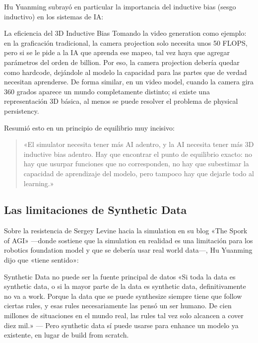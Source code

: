Hu Yuanming subrayó en particular la importancia del inductive bias (sesgo inductivo) en los sistemas de IA:

\begin{importantbox}{La eficiencia del 3D Inductive Bias}
Tomando la video generation como ejemplo: en la graficación tradicional, la camera projection solo necesita unos 50 FLOPS, pero si se le pide a la IA que aprenda ese mapeo, tal vez haya que agregar parámetros del orden de billion. Por eso, la camera projection debería quedar como hardcode, dejándole al modelo la capacidad para las partes que de verdad necesitan aprenderse. De forma similar, en un video model, cuando la camera gira 360 grados aparece un mundo completamente distinto; si existe una representación 3D básica, al menos se puede resolver el problema de physical persistency.
\end{importantbox}

Resumió esto en un principio de equilibrio muy incisivo:

\begin{quote}
«El simulator necesita tener más AI adentro, y la AI necesita tener más 3D inductive bias adentro. Hay que encontrar el punto de equilibrio exacto: no hay que usurpar funciones que no corresponden, no hay que subestimar la capacidad de aprendizaje del modelo, pero tampoco hay que dejarle todo al learning.»
\end{quote}

\subsection{Las limitaciones de Synthetic Data}

Sobre la resistencia de Sergey Levine hacia la simulation en su blog «The Spork of AGI» —donde sostiene que la simulation en realidad es una limitación para los robotics foundation model y que se debería usar real world data—, Hu Yuanming dijo que «tiene sentido»:

\begin{warningbox}{Synthetic Data no puede ser la fuente principal de datos}
«Si toda la data es synthetic data, o si la mayor parte de la data es synthetic data, definitivamente no va a work. Porque la data que se puede synthesize siempre tiene que follow ciertas rules, y esas rules necesariamente las pensó un ser humano. De cien millones de situaciones en el mundo real, las rules tal vez solo alcancen a cover diez mil.» — Pero synthetic data sí puede usarse para enhance un modelo ya existente, en lugar de build from scratch.
\end{warningbox}

